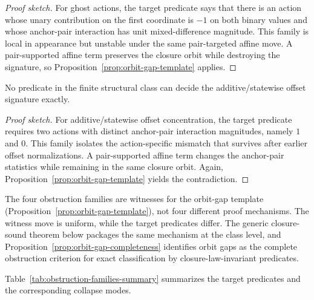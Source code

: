\begin{proof}[Proof sketch]
For ghost actions, the target predicate says that there is an action whose unary contribution on the first coordinate is $-1$ on both binary values and whose anchor-pair interaction has unit mixed-difference magnitude. This family is local in appearance but unstable under the same pair-targeted affine move. A pair-supported affine term preserves the closure orbit while destroying the signature, so Proposition~\ref{prop:orbit-gap-template} applies.
\end{proof}

\begin{theorem}\label{thm:offset-admissible-no-go}
No predicate in the finite structural class can decide the additive/statewise offset signature exactly.
\end{theorem}

\begin{proof}[Proof sketch]
For additive/statewise offset concentration, the target predicate requires two actions with distinct anchor-pair interaction magnitudes, namely $1$ and $0$. This family isolates the action-specific mismatch that survives after earlier offset normalizations. A pair-supported affine term changes the anchor-pair statistics while remaining in the same closure orbit. Again, Proposition~\ref{prop:orbit-gap-template} yields the contradiction.
\end{proof}

The four obstruction families are witnesses for the orbit-gap template (Proposition~\ref{prop:orbit-gap-template}), not four different proof mechanisms. The witness move is uniform, while the target predicates differ. The generic closure-sound theorem below packages the same mechanism at the class level, and Proposition~\ref{prop:orbit-gap-completeness} identifies orbit gaps as the complete obstruction criterion for exact classification by closure-law-invariant predicates.

Table~\ref{tab:obstruction-families-summary} summarizes the target predicates and the corresponding collapse modes.

